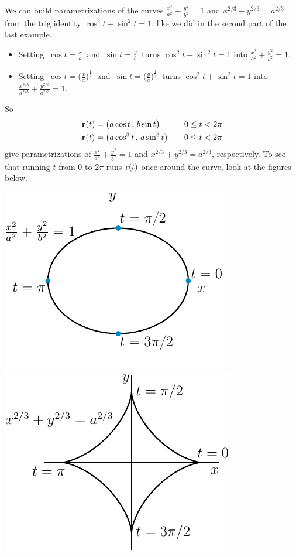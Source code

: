 \begin{eg}[Parametrization of  $\frac{x^2}{a^2}+\frac{y^2}{b^2}=1$ and of
$x^{2/3}+y^{2/3}=a^{2/3}$]    \label{eg:paramEllipse}

We can build parametrizations of the curves $\frac{x^2}{a^2}+\frac{y^2}{b^2}=1$ 
and $x^{2/3}+y^{2/3}=a^{2/3}$ from the trig identity $\cos^2 t + \sin^2 t=1$,
like we did in the second part of the last example.
\begin{itemize}
\item
Setting $\ \cos t=\frac{x}{a}\ $ and $\ \sin t=\frac{y}{b}\ $ turns  
$\cos^2 t +\sin^2 t =1$ into $\frac{x^2}{a^2}+\frac{y^2}{b^2}=1$.

\item
Setting $\ \cos t= \big(\frac{x}{a}\big)^{\frac{1}{3}}\ $ and 
$\ \sin t=\big(\frac{y}{a}\big)^{\frac{1}{3}}\ $ turns  
$\cos^2 t +\sin^2 t =1$ into $\frac{x^{2/3}}{a^{2/3}}+\frac{y^{2/3}}{a^{2/3}}=1$.
\end{itemize}
So
\begin{alignat*}{3}
\mathbf{r}(t) &= \big(a\cos t\,,\,b\sin t\big)\qquad &0\le t< 2\pi
\\
\mathbf{r}(t) &= \big(a\cos^3 t\,,\,a\sin^3 t\big) &0\le t< 2\pi
\end{alignat*}
give parametrizations of $\frac{x^2}{a^2}+\frac{y^2}{b^2}=1$ 
and $x^{2/3}+y^{2/3}=a^{2/3}$, respectively. To see that running $t$ from $0$ to $2\pi$ runs $\mathbf{r}(t)$ once around the curve, look at the figures below.
\begin{wfig}
\begin{center}
     \includegraphics{parEllipse.pdf}\quad
     \includegraphics{astroid4.pdf}

\end{center}
\end{wfig}
\end{eg}
